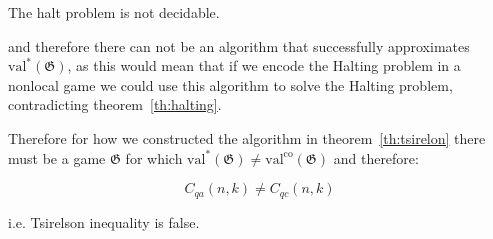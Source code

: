 \begin{theorem}\label{th:halting}
    The halt problem is not decidable.
\end{theorem}

and therefore there can not be an algorithm that successfully approximates $\operatorname{val^{*}}(\mathfrak{G})$, as this would mean that if we encode the Halting problem in a nonlocal game we could use this algorithm to solve the Halting problem, contradicting theorem~\ref{th:halting}.

Therefore for how we constructed the algorithm in theorem~\ref{th:tsirelon} there must be a game $\mathfrak{G}$ for which $\operatorname{val^{*}}(\mathfrak{G}) \neq  \operatorname{val^{co}}(\mathfrak{G})$ and therefore:

\begin{theorem}
    \begin{equation}
    C_{q a}(n, k) \neq C_{q c}(n, k)
    \end{equation}
\end{theorem}

i.e. Tsirelson inequality is false.



